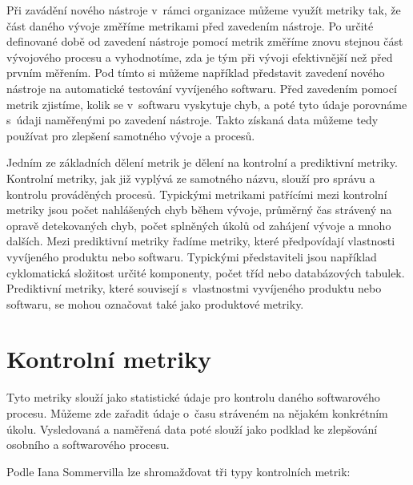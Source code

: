 \documentclass[czech,master]{diploma}
\begin{document}
Při zavádění nového nástroje v~rámci organizace můžeme využít metriky tak, že část daného vývoje změříme metrikami před zavedením nástroje. Po určité definované době od zavedení nástroje pomocí metrik změříme znovu stejnou část vývojového procesu a vyhodnotíme, zda je tým při vývoji efektivnější než před prvním měřením. Pod tímto si můžeme například představit zavedení nového nástroje na automatické testování vyvíjeného softwaru. Před zavedením pomocí metrik zjistíme, kolik se v~softwaru vyskytuje chyb, a poté tyto údaje porovnáme s~údaji naměřenými po zavedení nástroje. Takto získaná data můžeme tedy používat pro zlepšení samotného vývoje a procesů.

Jedním ze základních dělení metrik je dělení na kontrolní a prediktivní metriky. Kontrolní metriky, jak již vyplývá ze samotného názvu, slouží pro správu a kontrolu prováděných procesů. Typickými metrikami patřícími mezi kontrolní metriky jsou počet nahlášených chyb během vývoje, průměrný čas strávený na opravě detekovaných chyb, počet splněných úkolů od zahájení vývoje a mnoho dalších. Mezi prediktivní metriky řadíme metriky, které předpovídají vlastnosti vyvíjeného produktu nebo softwaru. Typickými představiteli jsou například cyklomatická složitost určité komponenty, počet tříd nebo databázových tabulek. Prediktivní metriky, které souvisejí s~vlastnostmi vyvíjeného produktu nebo softwaru, se mohou označovat také jako produktové metriky. \cite{ref:metric_definition}

\section{Kontrolní metriky}
Tyto metriky slouží jako statistické údaje pro kontrolu daného softwarového procesu. Můžeme zde zařadit údaje o~času stráveném na nějakém konkrétním úkolu. Vysledovaná a naměřená data poté slouží jako podklad ke zlepšování osobního a softwarového procesu.

Podle Iana Sommervilla \cite{ref:kontrolni_metriky} lze shromažďovat tři typy kontrolních metrik:
\end{document}

